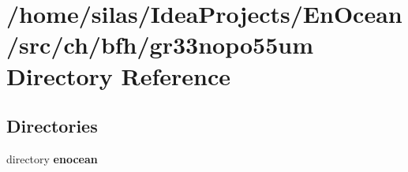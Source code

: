 \section{/home/silas/\+Idea\+Projects/\+En\+Ocean/src/ch/bfh/gr33nopo55um Directory Reference}
\label{dir_6a3eb57315eb8e21a22744f408e8c862}
\subsection*{Directories}
\begin{DoxyCompactItemize}
\item 
directory {\bf enocean}
\end{DoxyCompactItemize}
